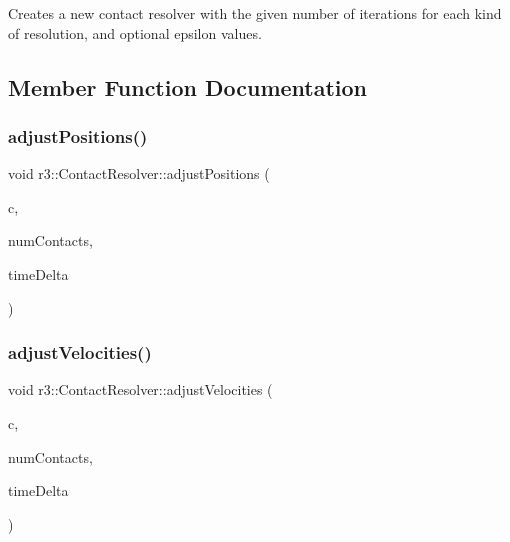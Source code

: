 Creates a new contact resolver with the given number of iterations for each kind of resolution, and optional epsilon values. 

\subsection{Member Function Documentation}
\mbox{\label{classr3_1_1_contact_resolver_a5dc41bad46cf659b93488f7c7db74712}} 
\subsubsection{\texorpdfstring{adjust\+Positions()}{adjustPositions()}}
{\footnotesize\ttfamily void r3\+::\+Contact\+Resolver\+::adjust\+Positions (\begin{DoxyParamCaption}\item[{\mbox{\hyperlink{classr3_1_1_contact_old}{Contact\+Old}} $\ast$}]{c,  }\item[{unsigned}]{num\+Contacts,  }\item[{\mbox{\hyperlink{namespacer3_ab2016b3e3f743fb735afce242f0dc1eb}{real}}}]{time\+Delta }\end{DoxyParamCaption})}

\mbox{\label{classr3_1_1_contact_resolver_aa5d26e400938482f47fd5efa760ea9d3}} 
\subsubsection{\texorpdfstring{adjust\+Velocities()}{adjustVelocities()}}
{\footnotesize\ttfamily void r3\+::\+Contact\+Resolver\+::adjust\+Velocities (\begin{DoxyParamCaption}\item[{\mbox{\hyperlink{classr3_1_1_contact_old}{Contact\+Old}} $\ast$}]{c,  }\item[{unsigned}]{num\+Contacts,  }\item[{\mbox{\hyperlink{namespacer3_ab2016b3e3f743fb735afce242f0dc1eb}{real}}}]{time\+Delta }\end{DoxyParamCaption})}

